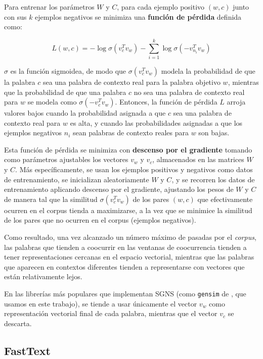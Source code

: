 Para entrenar los parámetros $W$ y $C$, para cada ejemplo positivo $(w,c)$ junto con sus $k$ ejemplos negativos se minimiza una \textbf{función de pérdida} definida como: 

\begin{equation}
    L(w,c) = -\log \sigma(v_c^T v_w) - \sum_{i=1}^k \log \sigma(-v_{n_i}^T v_w)
\end{equation}

$\sigma$ es la función sigmoidea, de modo que $\sigma(v_c^T v_w)$ modela la probabilidad de que la palabra $c$ sea una palabra de contexto real para la palabra objetivo $w$, mientras que la probabilidad de que una palabra $c$ no sea una palabra de contexto real para $w$ se modela como $\sigma(-v_{c}^T v_w)$. Entonces, la función de pérdida $L$ arroja valores bajos cuando la probabilidad asignada a que $c$ sea una palabra de contexto real para $w$ es alta, y cuando las probabilidades asignadas a que los ejemplos negativos $n_i$ sean palabras de contexto reales para $w$ son bajas.

Esta función de pérdida se minimiza con \textbf{descenso por el gradiente} tomando como parámetros ajustables los vectores $v_w$ y $v_c$, almacenados en las matrices $W$ y $C$. Más específicamente, se usan los ejemplos positivos y negativos como datos de entrenamiento, se inicializan aleatoriamente $W$ y $C$, y se recorren los datos de entrenamiento aplicando descenso por el gradiente, ajustando los pesos de $W$ y $C$ de manera tal que la similitud $\sigma(v_c^T v_w)$ de los pares $(w, c)$ que efectivamente ocurren en el corpus tienda a maximizarse, a la vez que se minimice la similitud de los pares que no ocurren en el corpus (ejemplos negativos). 

Como resultado, una vez alcanzado un número máximo de pasadas por el \emph{corpus}, las palabras que tienden a coocurrir en las ventanas de coocurrencia tienden a tener representaciones cercanas en el espacio vectorial, mientras que las palabras que aparecen en contextos diferentes tienden a representarse con vectores que están relativamente lejos.

En las librerías más populares que implementan SGNS (como \texttt{gensim} de \citealp{rehurek2010gensim}, que usamos en este trabajo), se tiende a usar únicamente el vector $v_w$ como representación vectorial final de cada palabra, mientras que el vector $v_c$ se descarta.


\subsection{FastText} \label{sec:fasttext}

